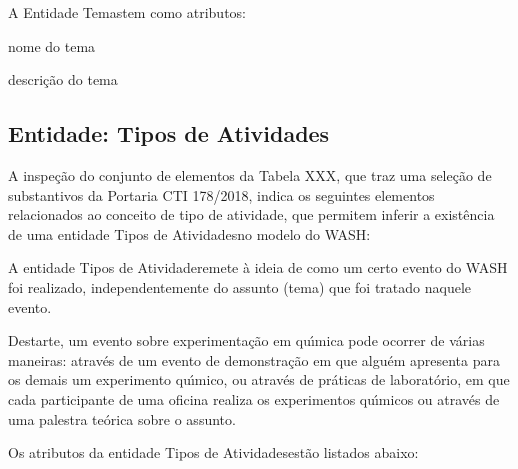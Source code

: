 \documentclass[
12pt,		%
openright,	%
twoside,  %
a4paper,			%
chapter=TITLE,		%
english,			%
french,				%
spanish,			%
brazil				%
]{USPSC-classe/USPSC}
\begin{document}
A Entidade \textquotedbl Temas\textquotedbl  tem como atributos:



\begin{alineas}
\item nome do tema
\item descri\c{c}\~ao do tema
\end{alineas}

\subsection[Entidade: Tipos de Atividades]{Entidade: Tipos de Atividades}\label{Entidade: Tipos de Atividades}
A inspe\c{c}\~ao do conjunto de elementos da Tabela XXX, que traz uma sele\c{c}\~ao de substantivos da Portaria CTI 178/2018, indica os seguintes elementos relacionados ao conceito de \textquotedbl tipo de atividade\textquotedbl , que permitem inferir a exist\^encia de uma entidade \textquotedbl Tipos de Atividades\textquotedbl  no modelo do WASH:



\noindent\begin{center}\mbox{\centering{}}\end{center}


A entidade \textquotedbl Tipos de Atividade\textquotedbl  remete \`a ideia de como um certo evento do WASH foi realizado, independentemente do assunto (tema) que foi tratado naquele evento.


Destarte, um evento sobre experimenta\c{c}\~ao em qu\'{\i}mica pode ocorrer de v\'arias maneiras: atrav\'es de um evento de demonstra\c{c}\~ao em que algu\'em apresenta para os demais um experimento qu\'{\i}mico, ou atrav\'es de pr\'aticas de laborat\'orio, em que cada participante de uma oficina realiza os experimentos qu\'{\i}micos ou atrav\'es de uma palestra te\'orica sobre o assunto.


Os atributos da entidade \textquotedbl Tipos de Atividades\textquotedbl  est\~ao listados abaixo:
\end{document}
